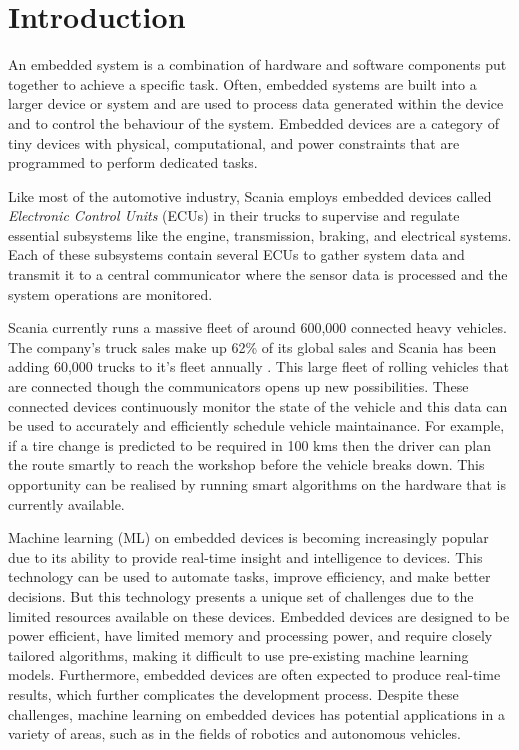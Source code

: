 \part{Introduction}

An embedded system is a combination of hardware and software components put together to achieve a specific task. Often, embedded systems are built into a larger device or system and are used to process data generated within the device and to control the behaviour of the system. Embedded devices are a category of tiny devices with physical, computational, and power constraints that are programmed to perform dedicated tasks.

Like most of the automotive industry, Scania employs embedded devices called \textit{Electronic Control Units} (ECUs) in their trucks to supervise and regulate essential subsystems like the engine, transmission, braking, and electrical systems. Each of these subsystems contain several ECUs to gather system data and transmit it to a central communicator where the sensor data is processed and the system operations are monitored.

Scania currently runs a massive fleet of around 600,000 connected heavy vehicles. The company's truck sales make up 62\% of its global sales and Scania has been adding 60,000 trucks to it's fleet annually \cite{scania-report}. This large fleet of rolling vehicles that are connected though the communicators opens up new possibilities. These connected devices continuously monitor the state of the vehicle and this data can be used to accurately and efficiently schedule vehicle maintainance. For example, if a tire change is predicted to be required in 100 kms then the driver can plan the route smartly to reach the workshop before the vehicle breaks down. This opportunity can be realised by running smart algorithms on the hardware that is currently available.

Machine learning (ML) on embedded devices is becoming increasingly popular due to its ability to provide real-time insight and intelligence to devices. This technology can be used to automate tasks, improve efficiency, and make better decisions. But this technology presents a unique set of challenges due to the limited resources available on these devices. Embedded devices are designed to be power efficient, have limited memory and processing power, and require closely tailored algorithms, making it difficult to use pre-existing machine learning models. Furthermore, embedded devices are often expected to produce real-time results, which further complicates the development process. Despite these challenges, machine learning on embedded devices has potential applications in a variety of areas, such as in the fields of robotics and autonomous vehicles.


